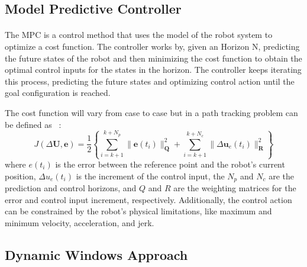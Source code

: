 \subsection{Model Predictive Controller}
\label{subsec:MPC}
\paragraph{}The \gls{MPC} is a control method that uses the model of the robot system to optimize 
a cost function. The controller works by, given an Horizon N, predicting the future states of the robot and then minimizing
 the cost function to obtain the optimal control inputs for the states in the horizon. The controller keeps iterating 
this process, predicting the future states and optimizing control action until the goal configuration is reached.

The cost function will vary from case to case but in a path tracking problem can be defined as ~\cite{MPCcost}:
\begin{equation}
    J(\Delta \mathbf{U}, \mathbf{e}) = \frac{1}{2} \left\{ \sum_{i=k+1}^{k+N_p} \|\mathbf{e}(t_i)\|_{\mathbf{Q}}^2 + \sum_{i=k+1}^{k+N_c} \|\Delta \mathbf{u}_e(t_i)\|_{\mathbf{R}}^2 \right\}
\end{equation}
where $e(t_i)$ is the error between the reference point and the robot's current position, $\Delta u_e(t_i)$ is the increment of the control input, the 
$N_p$ and $N_c$ are the prediction and control horizons, and $Q$ and $R$ are the weighting matrices for the error and control input increment, respectively. 
Additionally, the control action can be constrained by the robot's physical limitations, like maximum and minimum velocity, acceleration, and jerk.

\subsection{Dynamic Windows Approach}
\label{subsec:DWA}

